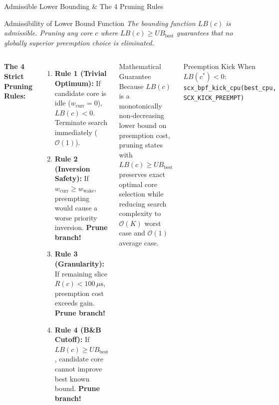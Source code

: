 \documentclass{beamer}
\begin{document}
\begin{frame}{Admissible Lower Bounding \& The 4 Pruning Rules}
  \begin{block}{Admissibility of Lower Bound Function}
    \footnotesize
    \textit{The bounding function $LB(c)$ is admissible. Pruning any core $c$ where $LB(c) \ge UB_{\text{best}}$ guarantees that no globally superior preemption choice is eliminated.}
  \end{block}

  \vspace{0.1cm}
  \begin{columns}[T]
      \textbf{The 4 Strict Pruning Rules:}
      \begin{enumerate}\itemsep2pt\tiny
        \item \textbf{Rule 1 (Trivial Optimum):} If candidate core is idle ($w_{\text{curr}} = 0$), $LB(c) < 0$. Terminate search immediately ($\mathcal{O}(1)$).
        \item \textbf{Rule 2 (Inversion Safety):} If $w_{\text{curr}} \ge w_{\text{wake}}$, preempting would cause a worse priority inversion. \textbf{Prune branch!}
        \item \textbf{Rule 3 (Granularity):} If remaining slice $R(c) < 100\,\mu\text{s}$, preemption cost exceeds gain. \textbf{Prune branch!}
        \item \textbf{Rule 4 (B\&B Cutoff):} If $LB(c) \ge UB_{\text{best}}$, candidate core cannot improve best known bound. \textbf{Prune branch!}
      \end{enumerate}

      \begin{alertblock}{\small Mathematical Guarantee}
        \scriptsize
        Because $LB(c)$ is a monotonically non-decreasing lower bound on preemption cost, pruning states with $LB(c) \ge UB_{\text{best}}$ preserves exact optimal core selection while reducing search complexity to $\mathcal{O}(K)$ worst case and $\mathcal{O}(1)$ average case.
      \end{alertblock}
      \vspace{0.05cm}
      \begin{exampleblock}{\small Preemption Kick}
        \tiny
        When $LB(c^*) < 0$: \texttt{scx\_bpf\_kick\_cpu(best\_cpu, SCX\_KICK\_PREEMPT)}
      \end{exampleblock}
  \end{columns}
\end{frame}
\end{document}
